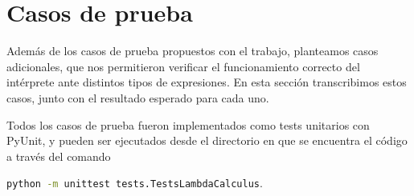\documentclass[11pt]{article}
\begin{document}

\section{Casos de prueba}



Además de los casos de prueba propuestos con el trabajo, planteamos casos
adicionales, que nos permitieron verificar el funcionamiento correcto del
intérprete ante distintos tipos de expresiones. En esta sección transcribimos
estos casos, junto con el resultado esperado para cada uno.

Todos los casos de prueba fueron implementados como tests unitarios con
PyUnit, y pueden ser ejecutados desde el directorio en que se encuentra el
código a través del comando
\begin{center}\lstinline[language=bash]
	{python -m unittest tests.TestsLambdaCalculus}.
\end{center}
\end{document}
